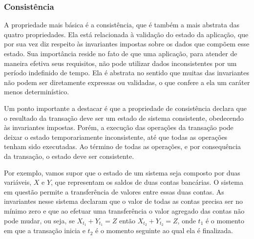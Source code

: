 \documentclass[11pt,twoside,a4paper]{book}
\begin{document}




\subsubsection*{Consistência}
A propriedade mais básica é a consistência, que é também a mais abstrata das quatro propriedades. Ela está relacionada à validação do estado da aplicação, que por sua vez diz respeito às invariantes impostas sobre os dados que compõem esse estado. Sua importância reside no fato de que uma aplicação, para atender de maneira efetiva seus requisitos, não pode utilizar dados inconsistentes por um período indefinido de tempo. Ela é abstrata no sentido que muitas das invariantes não podem ser diretamente expressas ou validadas, o que confere a ela um caráter menos determinístico.

Um ponto importante a destacar é que a propriedade de consistência declara que o resultado da transação deve ser um estado de sistema consistente, obedecendo às invariantes impostas. Porém, a execução das operações da transação pode deixar o estado temporariamente inconsistente, até que todas as operações tenham sido executadas. Ao término de todas as operações, e por consequência da transação, o estado deve ser consistente.

Por exemplo, vamos supor que o estado de um sistema seja composto por duas variáveis, $X$ e $Y$, que representam os saldos de duas contas bancárias. O sistema em questão permite a transferência de valores entre essas duas contas. As invariantes nesse sistema declaram que o valor de todas as contas precisa ser no mínimo zero e que ao efetuar uma transferência o valor agregado das contas não pode mudar, ou seja, se $X_{t_1} + Y_{t_1} = Z$ então $X_{t_2} + Y_{t_2} = Z$, onde $t_1$ é o momento em que a transação inicia e $t_2$ é o momento seguinte ao qual ela é finalizada.
\end{document}
